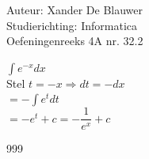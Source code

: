 \documentclass[a4paper]{article}
\begin{document}
\noindent \large Auteur: Xander De Blauwer \\
\noindent \large Studierichting: Informatica\\
\noindent \large Oefeningenreeks 4A nr. 32.2\\

\medskip

\normalsize

$ \displaystyle\int e^{-x}dx $ \\

Stel $t = -x \Rightarrow dt = -dx $ \\

$ = -\displaystyle\int e^tdt $ \\

$ = -e^t + c = -\dfrac{1}{e^x} + c $ \\ 



\begin{thebibliography}{999}
\end{thebibliography}
\end{document}
